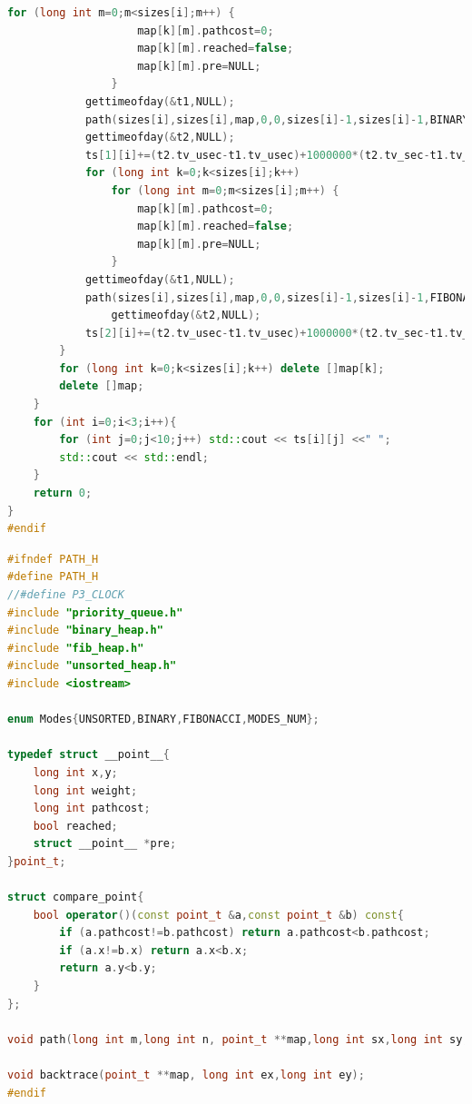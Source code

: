 \documentclass{article}
\begin{document}
\begin{lstlisting}[title=main.cpp,language=C++]
                for (long int m=0;m<sizes[i];m++) {
                    map[k][m].pathcost=0;
                    map[k][m].reached=false;
                    map[k][m].pre=NULL;
                }
            gettimeofday(&t1,NULL);
            path(sizes[i],sizes[i],map,0,0,sizes[i]-1,sizes[i]-1,BINARY,false);
            gettimeofday(&t2,NULL);
            ts[1][i]+=(t2.tv_usec-t1.tv_usec)+1000000*(t2.tv_sec-t1.tv_sec);
            for (long int k=0;k<sizes[i];k++)
                for (long int m=0;m<sizes[i];m++) {
                    map[k][m].pathcost=0;
                    map[k][m].reached=false;
                    map[k][m].pre=NULL;
                }
            gettimeofday(&t1,NULL);
            path(sizes[i],sizes[i],map,0,0,sizes[i]-1,sizes[i]-1,FIBONACCI,false);
                gettimeofday(&t2,NULL);
            ts[2][i]+=(t2.tv_usec-t1.tv_usec)+1000000*(t2.tv_sec-t1.tv_sec);
        }
        for (long int k=0;k<sizes[i];k++) delete []map[k];
        delete []map;
    }
    for (int i=0;i<3;i++){
        for (int j=0;j<10;j++) std::cout << ts[i][j] <<" ";
        std::cout << std::endl;
    }
    return 0;
}
#endif

\end{lstlisting}
\begin{lstlisting}[title=path.h,language=C++]
#ifndef PATH_H
#define PATH_H
//#define P3_CLOCK
#include "priority_queue.h"
#include "binary_heap.h"
#include "fib_heap.h"
#include "unsorted_heap.h"
#include <iostream>

enum Modes{UNSORTED,BINARY,FIBONACCI,MODES_NUM};

typedef struct __point__{
    long int x,y;
    long int weight;
    long int pathcost;
    bool reached;
    struct __point__ *pre;
}point_t;

struct compare_point{
    bool operator()(const point_t &a,const point_t &b) const{
        if (a.pathcost!=b.pathcost) return a.pathcost<b.pathcost;
        if (a.x!=b.x) return a.x<b.x;
        return a.y<b.y;
    }
};

void path(long int m,long int n, point_t **map,long int sx,long int sy,long int ex,long int ey,Modes mode,bool v);

void backtrace(point_t **map, long int ex,long int ey);
#endif

\end{lstlisting}
\end{document}
